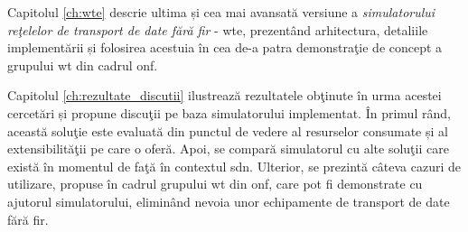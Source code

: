Capitolul \ref{ch:wte} descrie ultima și cea mai avansată versiune a \textit{simulatorului reţelelor de transport de date fără fir} - \gls{wte}, prezentând arhitectura, detaliile implementării și folosirea acestuia în cea de-a patra demonstraţie de concept a grupului \gls{wt} din cadrul \gls{onf}.

Capitolul \ref{ch:rezultate_discutii} ilustrează rezultatele obţinute în urma acestei cercetări și propune discuţii pe baza simulatorului implementat. În primul rând, această soluţie este evaluată din punctul de vedere al resurselor consumate și al extensibilităţii pe care o oferă. Apoi, se compară simulatorul cu alte soluţii care există în momentul de faţă în contextul \gls{sdn}. Ulterior, se prezintă câteva cazuri de utilizare, propuse în cadrul grupului \gls{wt} din \gls{onf}, care pot fi demonstrate cu ajutorul simulatorului, eliminând nevoia unor echipamente de transport de date fără fir.